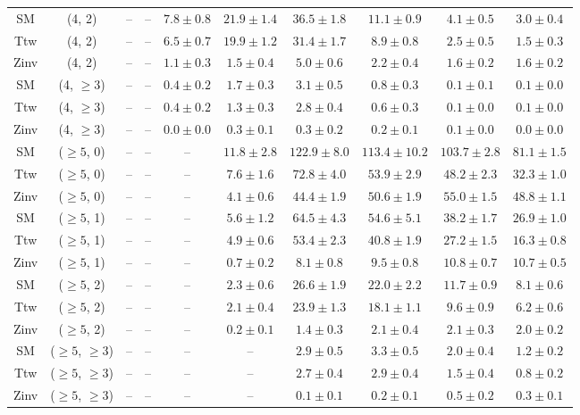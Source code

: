 \begin{table}[h!]
{\begin{tabular}{cccccccccc}
	SM & (4, 2) & -- & -- & $7.8\pm 0.8$ & $21.9\pm 1.4$ & $36.5\pm 1.8$ & $11.1\pm 0.9$ & $4.1\pm 0.5$ & $3.0\pm 0.4$ \\[0.5ex] 
	Ttw & (4, 2) & -- & -- & $6.5\pm 0.7$ & $19.9\pm 1.2$ & $31.4\pm 1.7$ & $8.9\pm 0.8$ & $2.5\pm 0.5$ & $1.5\pm 0.3$ \\[0.5ex] 
	Zinv & (4, 2) & -- & -- & $1.1\pm 0.3$ & $1.5\pm 0.4$ & $5.0\pm 0.6$ & $2.2\pm 0.4$ & $1.6\pm 0.2$ & $1.6\pm 0.2$ \\[0.5ex] 
	SM & (4, $\ge3$) & -- & -- & $0.4\pm 0.2$ & $1.7\pm 0.3$ & $3.1\pm 0.5$ & $0.8\pm 0.3$ & $0.1\pm 0.1$ & $0.1\pm 0.0$ \\[0.5ex] 
	Ttw & (4, $\ge3$) & -- & -- & $0.4\pm 0.2$ & $1.3\pm 0.3$ & $2.8\pm 0.4$ & $0.6\pm 0.3$ & $0.1\pm 0.0$ & $0.1\pm 0.0$ \\[0.5ex] 
	Zinv & (4, $\ge3$) & -- & -- & $0.0\pm 0.0$ & $0.3\pm 0.1$ & $0.3\pm 0.2$ & $0.2\pm 0.1$ & $0.1\pm 0.0$ & $0.0\pm 0.0$ \\[0.5ex] 
	SM & ($\ge5$, 0) & -- & -- & -- & $11.8\pm 2.8$ & $122.9\pm 8.0$ & $113.4\pm 10.2$ & $103.7\pm 2.8$ & $81.1\pm 1.5$ \\[0.5ex] 
	Ttw & ($\ge5$, 0) & -- & -- & -- & $7.6\pm 1.6$ & $72.8\pm 4.0$ & $53.9\pm 2.9$ & $48.2\pm 2.3$ & $32.3\pm 1.0$ \\[0.5ex] 
	Zinv & ($\ge5$, 0) & -- & -- & -- & $4.1\pm 0.6$ & $44.4\pm 1.9$ & $50.6\pm 1.9$ & $55.0\pm 1.5$ & $48.8\pm 1.1$ \\[0.5ex] 
	SM & ($\ge5$, 1) & -- & -- & -- & $5.6\pm 1.2$ & $64.5\pm 4.3$ & $54.6\pm 5.1$ & $38.2\pm 1.7$ & $26.9\pm 1.0$ \\[0.5ex] 
	Ttw & ($\ge5$, 1) & -- & -- & -- & $4.9\pm 0.6$ & $53.4\pm 2.3$ & $40.8\pm 1.9$ & $27.2\pm 1.5$ & $16.3\pm 0.8$ \\[0.5ex] 
	Zinv & ($\ge5$, 1) & -- & -- & -- & $0.7\pm 0.2$ & $8.1\pm 0.8$ & $9.5\pm 0.8$ & $10.8\pm 0.7$ & $10.7\pm 0.5$ \\[0.5ex] 
	SM & ($\ge5$, 2) & -- & -- & -- & $2.3\pm 0.6$ & $26.6\pm 1.9$ & $22.0\pm 2.2$ & $11.7\pm 0.9$ & $8.1\pm 0.6$ \\[0.5ex] 
	Ttw & ($\ge5$, 2) & -- & -- & -- & $2.1\pm 0.4$ & $23.9\pm 1.3$ & $18.1\pm 1.1$ & $9.6\pm 0.9$ & $6.2\pm 0.6$ \\[0.5ex] 
	Zinv & ($\ge5$, 2) & -- & -- & -- & $0.2\pm 0.1$ & $1.4\pm 0.3$ & $2.1\pm 0.4$ & $2.1\pm 0.3$ & $2.0\pm 0.2$ \\[0.5ex] 
	SM & ($\ge5$, $\ge3$) & -- & -- & -- & -- & $2.9\pm 0.5$ & $3.3\pm 0.5$ & $2.0\pm 0.4$ & $1.2\pm 0.2$ \\[0.5ex] 
	Ttw & ($\ge5$, $\ge3$) & -- & -- & -- & -- & $2.7\pm 0.4$ & $2.9\pm 0.4$ & $1.5\pm 0.4$ & $0.8\pm 0.2$ \\[0.5ex] 
	Zinv & ($\ge5$, $\ge3$) & -- & -- & -- & -- & $0.1\pm 0.1$ & $0.2\pm 0.1$ & $0.5\pm 0.2$ & $0.3\pm 0.1$ \\[0.5ex] 
	\hline
	\hline
\end{tabular}}
\end{table}
